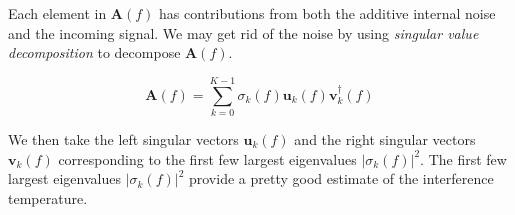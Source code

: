 \documentclass[12pt]{article}
\begin{document}
Each element in $\mathbf{A}(f)$ has contributions from both the additive internal noise and the incoming signal. We may get rid of the noise by using \emph{singular value decomposition}\cite{strang2009} to decompose $\mathbf{A}(f)$.

\begin{equation}
    \mathbf{A}(f) = \sum_{k=0}^{K-1} \sigma_k(f) \mathbf{u}_k(f) \mathbf{v}_k^{\dag}(f)
\end{equation}

We then take the left singular vectors $\mathbf{u}_k(f)$ and the right singular vectors $\mathbf{v}_k(f)$ corresponding to the first few largest eigenvalues $|\sigma_k(f)|^2$. The first few largest eigenvalues $|\sigma_k(f)|^2$ provide a pretty good estimate of the interference temperature.





\end{document}
